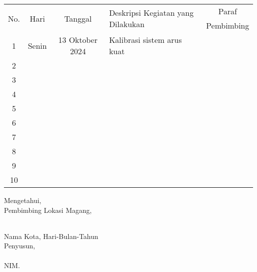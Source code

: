 \begin{table}[h]
    \begin{tabular}{|c|c|c|l|c|}
        \hline
        \multirow{2}{*}{No.} & \multirow{2}{*}{Hari} & \multirow{2}{*}{Tanggal} & \multirow{2}{*}{Deskripsi Kegiatan yang Dilakukan} & Paraf \\
          & & & & Pembimbing \\ \hline 
        1 & Senin & 13 Oktober 2024 & Kalibrasi sistem arus kuat & \\ \hline
        2 & & & & \\ \hline
        3 & & & & \\ \hline
        4 & & & & \\ \hline
        5 & & & & \\ \hline
        6 & & & & \\ \hline
        7 & & & & \\ \hline
        8 & & & & \\ \hline
        9 & & & & \\ \hline
        10 & & & & \\ \hline
    \end{tabular}
\end{table}

\vspace{2cm}


\begin{minipage}{0.45\textwidth}
    Mengetahui,\\
    Pembimbing Lokasi Magang,\\[2cm]
    \underline{\pembimbingPerusahaan}\\
    \jabatanPembimbing
\end{minipage}%
\hfill
 \begin{minipage}{0.45\textwidth}
    Nama Kota, Hari-Bulan-Tahun \\
    Penyusun, \\[2cm]
    \underline{\penulis}\\
    NIM. \nim
\end{minipage}